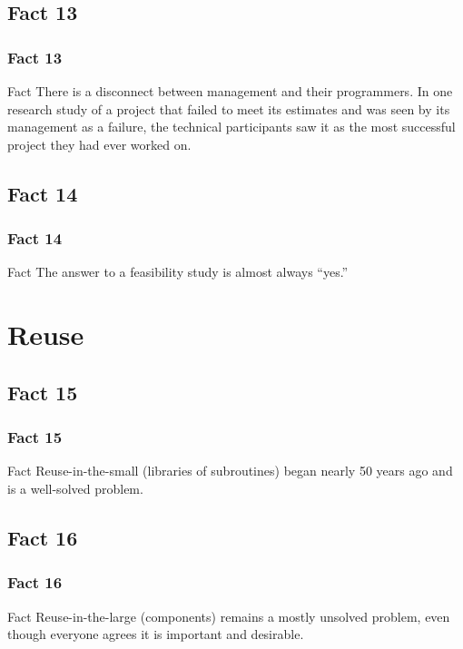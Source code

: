 \documentclass{beamer}
\begin{document}
\subsection{Fact 13}
\begin{frame}
    \frametitle{Fact 13}
    \begin{block}{Fact}
    There is a disconnect between management and their programmers. In one
    research study of a project that failed to meet its estimates and was seen
    by its management as a failure, the technical participants saw it as the
    most successful project they had ever worked on.
    \end{block}
\end{frame}

\subsection{Fact 14}
\begin{frame}
    \frametitle{Fact 14}
    \begin{block}{Fact}
    The answer to a feasibility study is almost always \enquote{yes.}
    \end{block}
\end{frame}

\section{Reuse}

\subsection{Fact 15}
\begin{frame}
    \frametitle{Fact 15}
    \begin{block}{Fact}
    Reuse-in-the-small (libraries of subroutines) began nearly 50 years ago and
    is a well-solved problem.
    \end{block}
\end{frame}

\subsection{Fact 16}
\begin{frame}
    \frametitle{Fact 16}
    \begin{block}{Fact}
    Reuse-in-the-large (components) remains a mostly unsolved problem, even
    though everyone agrees it is important and desirable.
    \end{block}
\end{frame}
\end{document}
